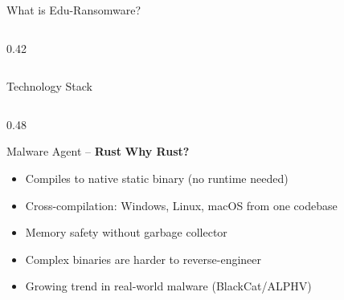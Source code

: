 \documentclass[aspectratio=169]{beamer}
\newcommand{\rustbadge}{\textcolor{rustcolor}{\textbf{Rust}}}
\begin{document}
\begin{frame}[fragile]{What is Edu-Ransomware?}
\begin{columns}[T]
\begin{column}{0.42\textwidth}
    \end{column}
  \end{columns}
\end{frame}

\begin{frame}{Technology Stack}
  \begin{columns}[T]
    \begin{column}{0.48\textwidth}
      \begin{exampleblock}{Malware Agent -- \rustbadge}
        \footnotesize
        \textbf{Why Rust?}
        \begin{itemize}
          \item Compiles to native static binary (no runtime needed)
          \item Cross-compilation: Windows, Linux, macOS from one codebase
          \item Memory safety without garbage collector
          \item Complex binaries are harder to reverse-engineer
          \item Growing trend in real-world malware (BlackCat/ALPHV)
        \end{itemize}


\end{exampleblock}
\end{column}
\end{columns}
\end{frame}
\end{document}

